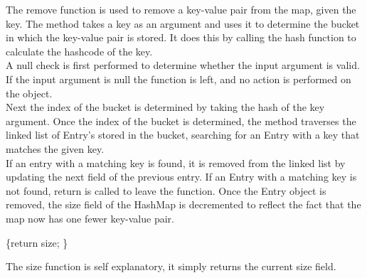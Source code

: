 \documentclass[a4paper]{article}
\begin{document}
The remove function is used to remove a key-value pair from the map, given the key.
The method takes a key as an argument and uses it to determine the bucket in which the key-value pair is stored.
It does this by calling the hash function to calculate the hashcode of the key. \\

A null check is first performed to determine whether the input argument is valid.
If the input argument is null the function is left, and no action is performed on the object. \\

Next the index of the bucket is determined by taking the hash of the key argument.
Once the index of the bucket is determined, the method traverses the linked list of Entry's stored in the bucket,
searching for an Entry with a key that matches the given key. \\

If an entry with a matching key is found, it is removed from the linked list by updating the next field of the previous entry.
If an Entry with a matching key is not found, return is called to leave the function.
Once the Entry object is removed, the size field of the HashMap is decremented to reflect the fact that the map now has one fewer key-value pair.

\pagebreak







\vspace{4mm}
\makeatletter
\renewcommand{\ALG@name}{Hashmap Method}
\makeatother

\begin{algorithm}
\caption{}\label{euclid}
\begin{algorithmic}[1]

\algrenewcommand{}
 {\{return size; \}}
\EndProcedure
\end{algorithmic}
\end{algorithm}

The size function is self explanatory, it simply returns the current size field.


\vspace{8mm}


\end{document}
